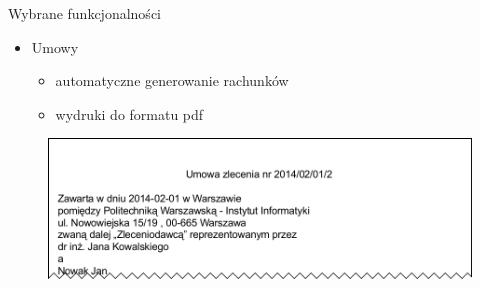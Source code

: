 \documentclass[10pt,utf8]{beamer}
\begin{document}
\begin{frame}{Wybrane funkcjonalności}
	\begin{itemize}
		\item Umowy
		\begin{itemize}
			\item automatyczne generowanie rachunków
			\item wydruki do formatu pdf
		\end{itemize}
	\end{itemize}
\begin{figure}[h]
    \begin{center}
    \includegraphics[angle=0,scale=0.45]{umowaPdf.png}
    \end{center}
    
\end{figure}
\end{frame}
\end{document}
